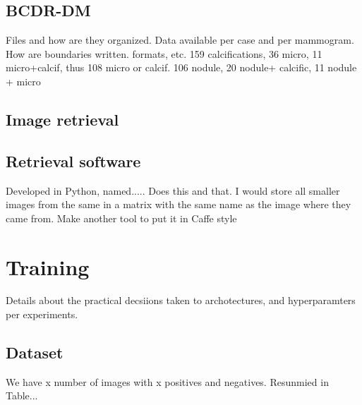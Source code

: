 \documentclass[11pt]{article}
\begin{document}
	\subsection{BCDR-DM}
	Files and how are they organized. Data available per case and per mammogram. How are boundaries written. formats, etc.
	159 calcifications, 36 micro, 11 micro+calcif, thus 108 micro or calcif. 106 nodule, 20 nodule+ calcific, 11 nodule + micro

	\subsection{Image retrieval}
	

	\subsection{Retrieval software}
Developed in Python, named..... Does this and that. I would store all smaller images from the same in a matrix with the same name as the image where they came from. 
Make another tool to put it in Caffe style




	\section{Training}
	Details about the practical decsiions taken to archotectures, and hyperparamters per experiments.

	\subsection{Dataset}
	We have x number of images with x positives and negatives. Resunmied in Table...
\end{document}
